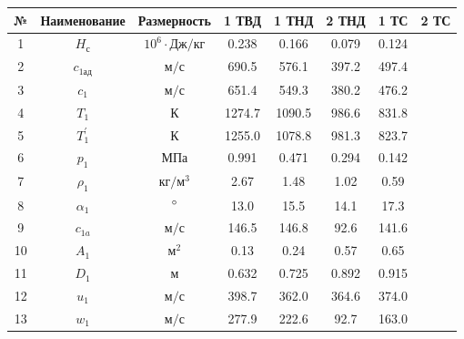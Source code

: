 \begin{landscape}
    \begin{center}
        \begin{longtable}{|c|c|c|c|c|c|c|c|}
            \hline
            \textbf{№} &
            \textbf{Наименование} &
            \textbf{Размерность} &
            \textbf{1 ТВД} &
            \textbf{1 ТНД} &
            \textbf{2 ТНД} &
            \textbf{1 ТС} &
            \textbf{2 ТС} \\\hline
            \endhead
            
            1 & $H_с$ & $10^6 \cdot Дж/кг$ & 0.238 & 0.166 & 0.079 & 0.124 \\\hline
            
            2 & $c_{1ад}$ & $м/с$ & 690.5 & 576.1 & 397.2 & 497.4 \\\hline
            
            3 & $c_{1}$ & $м/с$ & 651.4 & 549.3 & 380.2 & 476.2 \\\hline
            
            4 & $T_1$ & $К$ & 1274.7 & 1090.5 & 986.6 & 831.8 \\\hline
            
            5 & $T_1^\prime$ & $К$ & 1255.0 & 1078.8 & 981.3 & 823.7 \\\hline
            
            6 & $p_1$ & $МПа$ & 0.991 & 0.471 & 0.294 & 0.142 \\\hline
            
            7 & $\rho_1$ & $кг/м^3$ & 2.67 & 1.48 & 1.02 & 0.59 \\\hline
            
            8 & $\alpha_1$ & $\degree$ & 13.0 & 15.5 & 14.1 & 17.3 \\\hline
            
            9 & $c_{1a}$ & $м/с$ & 146.5 & 146.8 & 92.6 & 141.6 \\\hline
            
            10 & $A_1$ & $м^2$ & 0.13 & 0.24 & 0.57 & 0.65 \\\hline
            
            11 & $D_1$ & $м$ & 0.632 & 0.725 & 0.892 & 0.915 \\\hline
            
            12 & $u_1$ & $м/с$ & 398.7 & 362.0 & 364.6 & 374.0 \\\hline
            
            13 & $w_1$ & $м/с$ & 277.9 & 222.6 & 92.7 & 163.0 \\\hline
            

\end{longtable}
\end{center}
\end{landscape}
